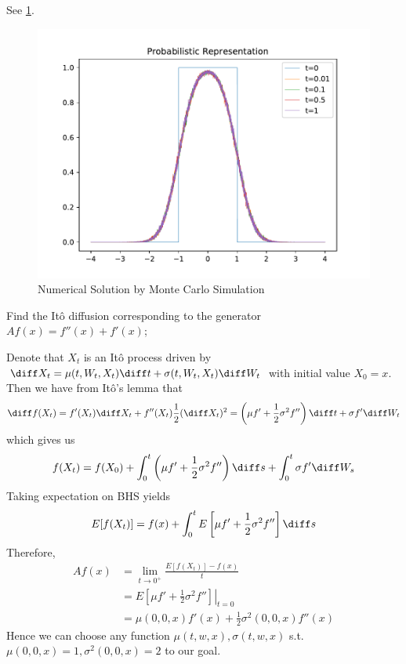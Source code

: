 \begin{subproblem}
    \item
    See \cref{fig:prob sol}.
    \begin{figure}[h]
        \centering
        \includegraphics[width=\textwidth]{prob-sol}
        \caption{Numerical Solution by Monte Carlo Simulation}
        \label{fig:prob sol}
    \end{figure}
\end{subproblem}

\problem
\begin{question}
    Find the It\^o diffusion corresponding to the generator $Af(x)=f''(x)+f'(x)$;
\end{question}
Denote that $X_t$ is an It\^o process
 driven by $\diff X_t=\mu(t,W_t,X_t)\diff t+\sigma(t,W_t,X_t)\diff W_t$
with initial value $X_0=x$.
Then we have from It\^o's lemma
that
\[\diff f(X_t)=f'(X_t)\diff X_t+f''(X_t)\frac{1}{2}(\diff X_t)^2
=\left(\mu f'+\frac{1}{2}\sigma^2 f''\right)\diff t+\sigma f'\diff W_t\]
which gives us
\[f(X_t)=f(X_0)+\int_0^t\left(\mu f'+\frac{1}{2}\sigma^2 f''\right)\diff s
+\int_0^t\sigma f'\diff W_s\]
Taking expectation on BHS yields
\[E[f(X_t)]=f(x)+\int_0^tE\left[\mu f'+\frac{1}{2}\sigma^2 f''\right]\diff s\]
Therefore,
\[\begin{aligned}
    Af(x)&=\lim_{t\to 0^+}\frac{E[f(X_t)]-f(x)}{t}\\
    &=\left.E\left[\mu f'+\frac{1}{2}\sigma^2 f''\right]\right|_{t=0}\\
    &=\mu(0,0,x) f'(x)+\frac{1}{2}\sigma^2(0,0,x) f''(x)
\end{aligned}\]
Hence we can choose any function $\mu(t,w,x),\sigma(t,w,x)$
s.t. $\mu(0,0,x)=1,\sigma^2(0,0,x)=2$ to
our goal.

